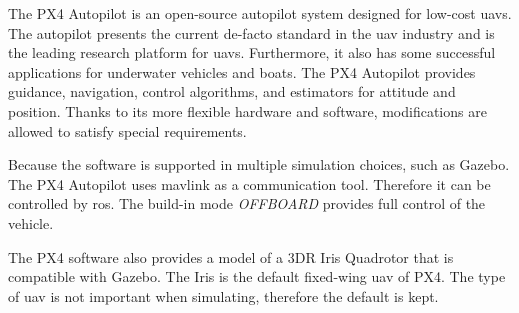 The PX4 Autopilot is an open\hyp{}source autopilot system designed for low\hyp{}cost \acsp{uav}. The autopilot presents the current de-facto standard in the \acs{uav} industry and is the leading research platform for \acsp{uav}. Furthermore, it also has some successful applications for underwater vehicles and boats. The PX4 Autopilot provides guidance, navigation, control algorithms, and estimators for attitude and position. Thanks to its more flexible hardware and software, modifications are allowed to satisfy special requirements. \cite{px4} \cite{dronecode_projects}

Because the software is supported in multiple simulation choices, such as Gazebo. The PX4 Autopilot uses \acs{mavlink} as a communication tool. Therefore it can be controlled by \acs{ros}. The build\hyp{}in mode \textit{OFFBOARD} provides full control of the vehicle. \cite{mimmoimplementation}

The PX4 software also provides a model of a 3DR Iris Quadrotor that is compatible with Gazebo. The Iris is the default fixed\hyp{}wing \acs{uav} of PX4. The type of \acs{uav} is not important when simulating, therefore the default is kept.